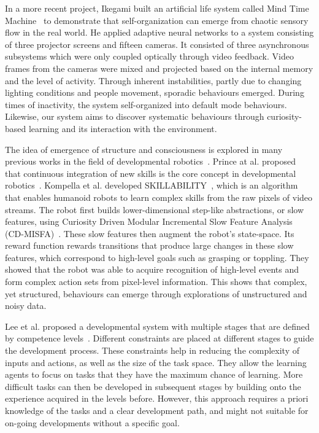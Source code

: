 In a more recent project, Ikegami built an artificial life system called Mind Time Machine~\cite{Ikegami2013} to demonstrate that self-organization can emerge from chaotic sensory flow in the real world. He applied adaptive neural networks to a system consisting of three projector screens and fifteen cameras. It consisted of three asynchronous subsystems which were only coupled optically through video feedback. Video frames from the cameras were mixed and projected based on the internal memory and the level of activity. Through inherent instabilities, partly due to changing lighting conditions and people movement, sporadic behaviours emerged. During times of inactivity, the system self-organized into default mode behaviours. Likewise, our system aims to discover systematic behaviours through curiosity-based learning and its interaction with the environment. 

The idea of emergence of structure and consciousness is explored in many previous works in the field of developmental robotics~\cite{Lungarella2003}\cite{Asada2009}. Prince at al. proposed that continuous integration of new skills is the core concept in developmental robotics~\cite{Prince2005}. Kompella et al. developed SKILLABILITY~\cite{Kompella2014}, which is an algorithm that enables humanoid robots to learn complex skills from the raw pixels of video streams. The robot first builds lower-dimensional step-like abstractions, or slow features, using Curiosity Driven Modular Incremental Slow Feature Analysis (CD-MISFA)~\cite{Luciw2013}. These slow features then augment the robot's state-space. Its reward function rewards transitions that produce large changes in these slow features, which correspond to high-level goals such as grasping or toppling. They showed that the robot was able to acquire recognition of high-level events and form complex action sets from pixel-level information. This shows that complex, yet structured, behaviours can emerge through explorations of unstructured and noisy data.

Lee et al. proposed a developmental system with multiple stages that are defined by competence levels~\cite{Lee2007}. Different constraints are placed at different stages to guide the development process. These constraints help in reducing the complexity of inputs and actions, as well as the size of the task space. They allow the learning agents to focus on tasks that they have the maximum chance of learning. More difficult tasks can then be developed in subsequent stages by building onto the experience acquired in the levels before. However, this approach requires a priori knowledge of the tasks and a clear development path, and might not suitable for on-going developments without a specific goal.

